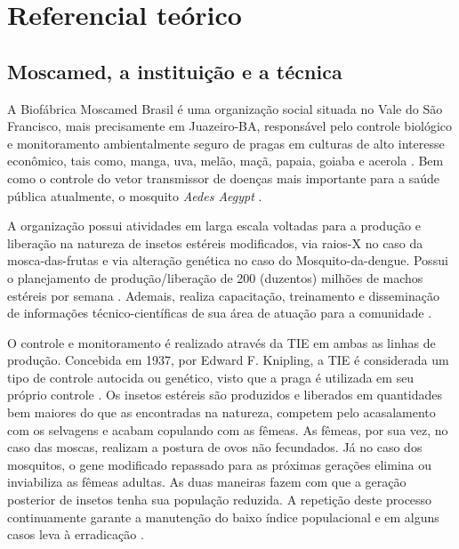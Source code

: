\chapter{Referencial teórico}

\section{Moscamed, a instituição e a técnica}

A Biofábrica Moscamed Brasil é uma organização social situada no Vale do São Francisco, mais precisamente em Juazeiro-BA, responsável pelo controle biológico e monitoramento ambientalmente seguro de pragas em culturas de alto interesse econômico, tais como, manga, uva, melão, maçã, papaia, goiaba e acerola \cite{MOSCAMED2010LINHAS}. Bem como o controle do vetor transmissor de doenças mais importante para a saúde pública atualmente, o mosquito \textit{Aedes Aegypt} \cite{MOSCAMEDINST2003, MOSCAMED2010LINHAS}.

A organização possui atividades em larga escala voltadas para a produção e liberação na natureza de insetos estéreis modificados, via raios-X no caso da mosca-das-frutas e via alteração genética no caso do Mosquito-da-dengue. Possui o planejamento de produção/liberação de 200 (duzentos) milhões de machos estéreis por semana \cite{MOSCAMEDINST2003, MOSCAMED2003CTI}. Ademais, realiza capacitação, treinamento e disseminação de informações técnico-científicas de sua área de atuação para a comunidade \cite{MOSCAMED2010AREAS}.

O controle e monitoramento é realizado através da TIE em ambas as linhas de produção. Concebida em 1937, por Edward F. Knipling, a TIE é considerada um tipo de controle autocida ou genético, visto que a praga é utilizada em seu próprio controle \cite{TIE2015}. Os insetos estéreis são produzidos e liberados em quantidades bem maiores do que as encontradas na natureza, competem pelo acasalamento com os selvagens e acabam copulando com as fêmeas. As fêmeas, por sua vez, no caso das moscas, realizam a postura de ovos não fecundados. Já no caso dos mosquitos, o gene modificado repassado para as próximas gerações elimina ou inviabiliza as fêmeas adultas. As duas maneiras fazem com que a geração posterior de insetos tenha sua população reduzida. A repetição deste processo continuamente garante a manutenção do baixo índice populacional e em alguns casos leva à erradicação \cite{MOSCAMEDINST2003, MOSCAMED2003CTI, MOSCAMED2010LINHAS}.

